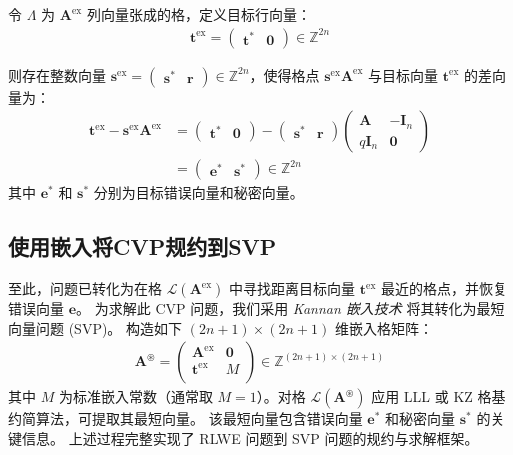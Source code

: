 \documentclass[12pt,a4paper]{article}
\newcommand{\supercite}[2][]{\textsuperscript{\citep[#1]{#2}}}
\numberwithin{equation}{section}
\begin{document}
令 $\Lambda$ 为 $\mathbf{A}^{\mathrm{ex}}$ 列向量张成的格，定义目标行向量：
\begin{align}
    \mathbf{t}^{\mathrm{ex}} = \begin{pmatrix}
        \mathbf{t}^* & \mathbf{0}
    \end{pmatrix} \in \mathbb{Z}^{2n}
\end{align}

则存在整数向量 $\mathbf{s}^{\mathrm{ex}} = \begin{pmatrix} \mathbf{s}^* & \mathbf{r} \end{pmatrix} \in \mathbb{Z}^{2n}$，使得格点 $\mathbf{s}^{\mathrm{ex}}\mathbf{A}^{\mathrm{ex}}$ 与目标向量 $\mathbf{t}^{\mathrm{ex}}$ 的差向量为：
\begin{align}
    \mathbf{t}^{\mathrm{ex}} - \mathbf{s}^{\mathrm{ex}}\mathbf{A}^{\mathrm{ex}} 
    &= \begin{pmatrix} \mathbf{t}^* & \mathbf{0} \end{pmatrix} 
    - \begin{pmatrix} \mathbf{s}^* & \mathbf{r} \end{pmatrix} 
    \begin{pmatrix}
        \mathbf{A} & -\mathbf{I}_n \\
        q\mathbf{I}_n & \mathbf{0}
    \end{pmatrix} \\
    &= \begin{pmatrix} \mathbf{e}^* & \mathbf{s}^* \end{pmatrix} \in \mathbb{Z}^{2n}
\end{align}
其中 $\mathbf{e}^*$ 和 $\mathbf{s}^*$ 分别为目标错误向量和秘密向量。

\subsection{使用嵌入将CVP规约到SVP}

至此，问题已转化为在格 $\mathcal{L}(\mathbf{A}^{\mathrm{ex}})$ 中寻找距离目标向量 $\mathbf{t}^{\mathrm{ex}}$ 最近的格点，并恢复错误向量 $\mathbf{e}$。
为求解此 CVP 问题，我们采用 \textit{Kannan 嵌入技术}\supercite{kannan1987} 将其转化为最短向量问题 (SVP)。
构造如下 $(2n+1) \times (2n+1)$ 维嵌入格矩阵：
\begin{align}
    \mathbf{A}^{\circledast} = 
    \begin{pmatrix}
        \mathbf{A}^{\mathrm{ex}} & \mathbf{0} \\
        \mathbf{t}^{\mathrm{ex}} & M \\   
    \end{pmatrix} \in \mathbb{Z}^{(2n+1) \times (2n+1)}
\end{align}
其中 $M$ 为标准嵌入常数（通常取 $M=1$）。对格 $\mathcal{L}(\mathbf{A}^{\circledast})$ 应用 LLL 或 KZ 格基约简算法，可提取其最短向量。
该最短向量包含错误向量 $\mathbf{e}^*$ 和秘密向量 $\mathbf{s}^*$ 的关键信息。
上述过程完整实现了 RLWE 问题到 SVP 问题的规约与求解框架。
\end{document}
